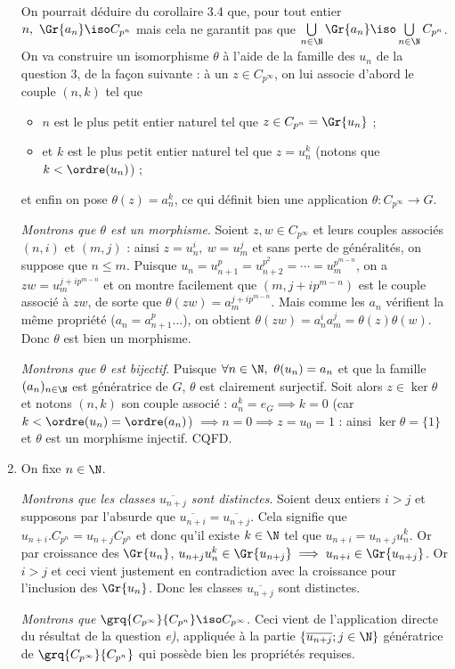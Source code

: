 \begin{enumerate}
    On pourrait déduire du corollaire 3.4 que, pour tout entier $n,~ \Gr{a_n}\iso C_{p^n}$ mais cela ne garantit pas que $\bigcup\limits_{n\in \N} \Gr{a_n} \iso \bigcup\limits_{n\in \N} C_{p^n}$.
    On va construire un isomorphisme $\theta$ à l'aide de la famille des $u_n$ de la question 3, de la façon suivante : à un $z\in C_{p^{\infty}}$, on lui associe d'abord le couple $(n,k)$ tel que 
    \begin{itemize}
        \item $n$ est le plus petit entier naturel tel que $z\in C_{p^n}= \Gr{u_n}$ ;
        \item et $k$ est le plus petit entier naturel tel que $z= u_n^k$ (notons que $k< \ordre(u_n)$) ;
    \end{itemize}
    et enfin on pose $\theta(z) = a_n^k$, ce qui définit bien une application $\theta\colon C_{p^{\infty}} \to G$.

    \emph{Montrons que $\theta$ est un morphisme}. Soient $z,w\in C_{p^{\infty}}$ et leurs couples associés $(n,i)$ et $(m,j)$ : ainsi $z= u_n^i,~ w=u_m^j$ et sans perte de généralités, on suppose que $n\leqslant m$.
    Puisque $u_n = u_{n+1}^p = u_{n+2}^{p^2} = \cdots = u_m^{p^{m-n}}$, on a $zw = u_m^{j+ip^{m-n}}$ et on montre facilement que $(m, j+ip^{m-n})$ est le couple associé à $zw$, de sorte que $\theta(zw) = a_m^{j+ip^{m-n}}$.
    Mais comme les $a_n$ vérifient la même propriété ($a_n = a_{n+1}^p \ldots$), on obtient $\theta(zw) = a_n^i a_m^j = \theta(z)\theta(w)$. Donc $\theta$ est bien un morphisme.

    \emph{Montrons que $\theta$ est bijectif}. Puisque $\forall n\in \N,~ \theta(u_n) = a_n$ et que la famille $(a_n)_{n\in \N}$ est génératrice de $G$, $\theta$ est clairement surjectif. 
    Soit alors $z\in \ker \theta$ et notons $(n,k)$ son couple associé : $a_n^k = e_G\implies k=0 $ (car $k < \ordre(u_n) = \ordre(a_n)$) $\implies n=0\implies z=u_0 = 1$ : ainsi $\ker \theta = \{1\}$ 
    et $\theta$ est un morphisme injectif. CQFD.
    
    \item On fixe $n\in \N$. 
    
    \emph{Montrons que les classes $\overline{u_{n+j}}$ sont distinctes}. Soient deux entiers $i>j$ et supposons par l'absurde que $\overline{u_{n+i}} = \overline{u_{n+j}}$. Cela signifie 
    que $u_{n+i}.C_{p^n} = u_{n+j}C_{p^n}$ et donc qu'il existe $k\in \N$ tel que $u_{n+i} = u_{n+j}u_n^k$. Or par croissance des $\Gr{u_n}$, $u_{n+j}u_n^k\in \Gr{u_{n+j}} \implies u_{n+i}\in \Gr{u_{n+j}}$. 
    Or $i>j$ et ceci vient justement en contradiction avec la croissance pour l'inclusion des $\Gr{u_n}$. Donc les classes $\overline{u_{n+j}}$ sont distinctes.\medskip

    \emph{Montrons que $\grq{C_{p^{\infty}}}{C_ {p^n}} \iso C_{p^{\infty}}$}. Ceci vient de l'application directe du résultat de la question \textit{e)}, appliquée à la partie $\left\{\overline{u_{n+j}}; j\in \N\right\}$ 
    génératrice de $ \grq{C_{p^{\infty}}}{C_ {p^n}}$ qui possède bien les propriétés requises.
    
\end{enumerate}

